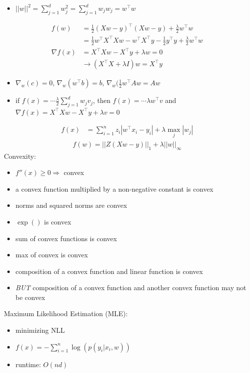 \documentclass[10pt,landscape,a4paper]{article}
\begin{document}
\begin{multicols*}{5}
\begin{itemize}
    \item \(||w||^2 = \sum\limits_{j=1}^{d} w_j^2 = \sum\limits_{j=1}^{d} w_j w_j = w^\intercal w \)
\end{itemize}
\begin{align*}
    f(w) &= \frac{1}{2} (Xw-y)^\intercal (Xw-y) + \frac{\lambda}{2} w^\intercal w \\
    &= \frac{1}{2} w^\intercal X^\intercal Xw - w^\intercal X^\intercal y - \frac{1}{2} y^\intercal y + \frac{\lambda}{2} w^\intercal w \\
    \nabla f(x) &= X^\intercal Xw - X^\intercal y + \lambda w = 0 \\
    & \rightarrow (X^\intercal X + \lambda I) w = X^\intercal y
\end{align*}
\begin{itemize}
    \item \(\nabla_w (c) = 0\), \(\nabla_w (w^\intercal b) = b\), \(\nabla_w (\frac{1}{2} w^\intercal A w = Aw\)
\end{itemize}
\begin{itemize}
    \item if \(f(x) = \cdots \frac{\lambda}{2} \sum\limits_{j=1}^{d} w_j v_j\), then \(f(x) = \cdots \lambda w^\intercal v\) and \(\nabla f(x) = X^\intercal Xw - X^\intercal y + \lambda v = 0\)
\end{itemize}
\begin{align*}
    f(x) &= \sum\limits_{i=1}^{n} z_i |w^\intercal x_i - y_i| + \lambda \max_j |w_j|
\end{align*}
\begin{align*}
    f(w) = ||Z(Xw - y)||_1 + \lambda ||w||_{\infty}
\end{align*}
Convexity:
\begin{itemize}
    \item \(f''(x) \geq 0 \Rightarrow \) convex
    \item a convex function multiplied by a non-negative constant is convex
    \item norms and squared norms are convex
    \item \(\exp()\) is convex
    \item sum of convex functions is convex
    \item max of convex is convex
    \item composition of a convex function and linear function is convex
    \item \emph{BUT} composition of a convex function and another convex function may not be convex
\end{itemize}
Maximum Likelihood Estimation (MLE):
\begin{itemize}
    \item minimizing NLL
    \item \(f(x) = - \sum_{i=1}^{n}\log{(p(y_i|x_i,w))}\)
    \item runtime: \(O(nd)\)
\end{itemize}


\end{multicols*}
\end{document}
